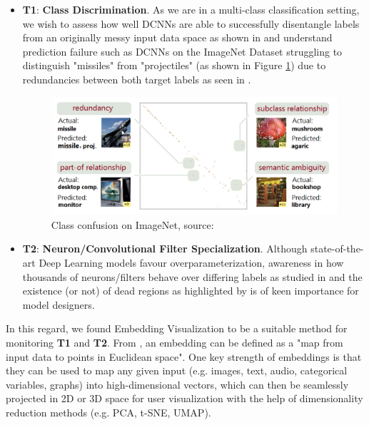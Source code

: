 \begin{itemize}
	\item \textbf{T1}: \textbf{Class Discrimination}. As we are in a multi-class classification setting, we wish to assess how well DCNNs are able to successfully disentangle labels from an originally messy input data space as shown in \cite{Rauber2017VisualizingTH} and understand prediction failure such as DCNNs on the ImageNet Dataset struggling to distinguish "missiles" from "projectiles" (as shown in Figure \ref{fig:HRV_001_Class_Hiearchy}) due to redundancies between both target labels as seen in \cite{Alsallakh2017Hierarchy}.
	
	\vspace{0.4cm}
	
	\begin{figure}[H]
		\centering
		\includegraphics[scale=0.5]{images/embedding_view/HRV_Fig_001_Class_Hiearchy.PNG}
		\caption{Class confusion on ImageNet, source: \cite{Alsallakh2017Hierarchy}}
		\label{fig:HRV_001_Class_Hiearchy}
	\end{figure}
	
	\vspace{0.1cm}
	
	\item \textbf{T2}: \textbf{Neuron/Convolutional Filter Specialization}. Although state-of-the-art Deep Learning models favour overparameterization, awareness in how thousands of neurons/filters behave over differing labels as studied in \cite{Rauber2017VisualizingTH} and the existence (or not) of dead regions as highlighted by \cite{Pezzotti2018DeepEyesPV} is of keen importance for model designers.
\end{itemize}

In this regard, we found Embedding Visualization to be a suitable method for monitoring \textbf{T1} and \textbf{T2}. From \cite{Smilkov2016EmbeddingPI}, an embedding can be defined as a "map from input data to points in Euclidean space". One key strength of embeddings is that they can be used to map any given input (e.g. images, text, audio, categorical variables, graphs) into high-dimensional vectors, which can then be seamlessly projected in 2D or 3D space for user visualization with the help of dimensionality reduction methods (e.g. PCA, t-SNE, UMAP).

